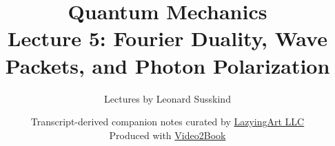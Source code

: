\documentclass[11pt,oneside]{book}
\begin{document}
\hypersetup{pageanchor=false}
\frontmatter
\title{Quantum Mechanics\\[0.45em]
\large Lecture 5: Fourier Duality, Wave Packets, and Photon Polarization}
\author{Lectures by Leonard Susskind}
\date{Transcript-derived companion notes curated by
\href{https://lazying.art}{LazyingArt LLC}\\[0.35em]
\small Produced with
\href{https://github.com/lachlanchen/Video2Book}{Video2Book}}
\maketitle
\hypersetup{pageanchor=true}
\mainmatter

\end{document}
